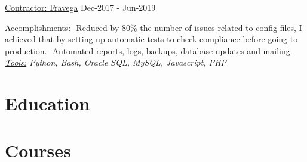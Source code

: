 \documentclass[letterpaper]{twentysecondcv} %
\begin{document}
{\large\underline{Contractor: Fravega}} \hspace*{155pt} Dec-2017 - Jun-2019
\newline

Accomplishments: 
    \newline-Reduced by 80\% the number of issues related to config files, I achieved that by setting up automatic tests to check compliance before going to production.
    \newline-Automated reports, logs, backups, database updates and mailing.
    \newline\textit{\underline{Tools:} Python, Bash, Oracle SQL, MySQL, Javascript, PHP}
    \newline


\section{Education}

\begin{twenty} %

\end{twenty}


\section{Courses}


 \begin{twenty}
 \end{twenty}
\end{document}
